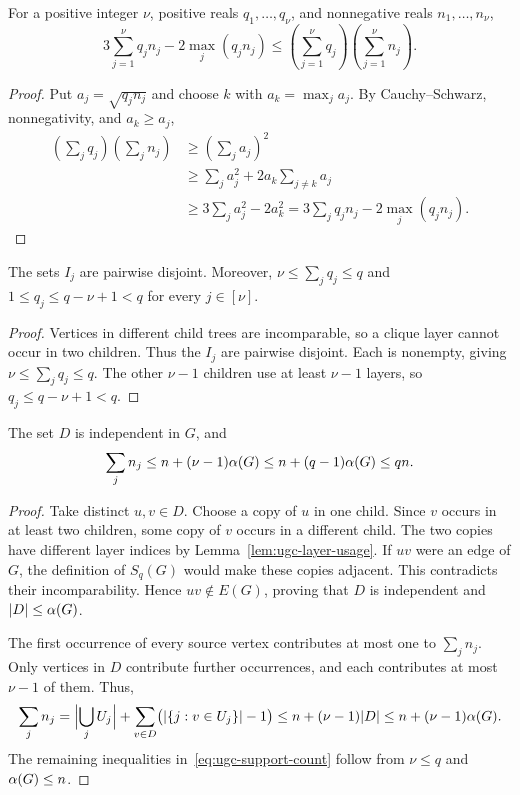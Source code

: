 \begin{lemma}\label{lem:branching-ineq}
For a positive integer $\nu$, positive reals $q_1,\ldots,q_\nu$, and nonnegative reals
$n_1,\ldots,n_\nu$,
\[
  3\sum_{j=1}^\nu q_jn_j-2\max_j(q_jn_j)
  \leq \left(\sum_{j=1}^\nu q_j\right)\left(\sum_{j=1}^\nu n_j\right).
\]
\end{lemma}

\begin{proof}
Put $a_j=\sqrt{q_jn_j}$ and choose $k$ with $a_k=\max_j a_j$.
By Cauchy--Schwarz, nonnegativity, and $a_k\geq a_j$,
\[
\begin{aligned}
 \left(\sum_jq_j\right)\left(\sum_jn_j\right)
 &\geq\left(\sum_ja_j\right)^2\\
 &\geq\sum_ja_j^2+2a_k\sum_{j\ne k}a_j\\
 &\geq3\sum_ja_j^2-2a_k^2
 =3\sum_jq_jn_j-2\max_j(q_jn_j).
\end{aligned}
\]
\end{proof}

\begin{lemma}\label{lem:ugc-layer-usage}
The sets $I_j$ are pairwise disjoint. Moreover,
$\nu\leq\sum_jq_j\leq q$ and $1\leq q_j\leq q-\nu+1<q$ for every
$j\in[\nu]$.
\end{lemma}

\begin{proof}
Vertices in different child trees are incomparable, so a clique
layer cannot occur in two children. Thus the $I_j$ are pairwise
disjoint. Each is nonempty, giving $\nu\leq\sum_jq_j\leq q$.
The other $\nu-1$ children use at least $\nu-1$ layers, so
$q_j\leq q-\nu+1<q$.
\end{proof}

\begin{lemma}
\label{lem:ugc-source-supports}
The set $D$ is independent in $G$, and
\begin{equation}\label{eq:ugc-support-count}
 \sum_jn_j\leq n+(\nu-1)\alpha(G)
 \leq n+(q-1)\alpha(G)\leq qn.
\end{equation}
\end{lemma}

\begin{proof}
Take distinct $u,v\in D$. Choose a copy of $u$ in one child. Since
$v$ occurs in at least two children, some copy of $v$ occurs in a
different child. The two copies have different layer indices by
Lemma~\ref{lem:ugc-layer-usage}. If $uv$ were an edge of $G$, the
definition of $S_q(G)$ would make these copies adjacent. This
contradicts their incomparability. Hence $uv\notin E(G)$, proving
that $D$ is independent and $|D|\leq\alpha(G)$.

The first occurrence of every source vertex contributes at most one
to $\sum_jn_j$. Only vertices in $D$ contribute further occurrences,
and each contributes at most $\nu-1$ of them. Thus,
\[
 \sum_jn_j
 =\Bigl|\bigcup_jU_j\Bigr|
   +\sum_{v\in D}\bigl(|\{j:v\in U_j\}|-1\bigr)
 \leq n+(\nu-1)|D|\leq n+(\nu-1)\alpha(G).
\]
The remaining inequalities in~\eqref{eq:ugc-support-count} follow
from $\nu\leq q$ and $\alpha(G)\leq n$.
\end{proof}

